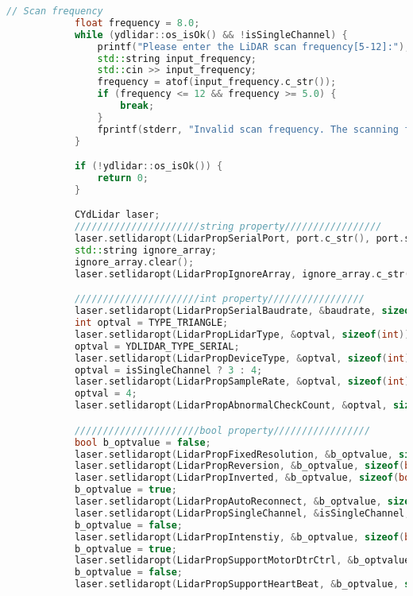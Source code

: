 \begin{lstlisting}[language={C++}, caption={C\'odigo de ejemplo de Kinect y LiDAR}, label={fresd}]
            // Scan frequency
            float frequency = 8.0;
            while (ydlidar::os_isOk() && !isSingleChannel) {
                printf("Please enter the LiDAR scan frequency[5-12]:");
                std::string input_frequency;
                std::cin >> input_frequency;
                frequency = atof(input_frequency.c_str());
                if (frequency <= 12 && frequency >= 5.0) {
                    break;
                }
                fprintf(stderr, "Invalid scan frequency. The scanning frequency range is 5 to 12 Hz. Please re-enter.\n");
            }

            if (!ydlidar::os_isOk()) {
                return 0;
            }

            CYdLidar laser;
            //////////////////////string property/////////////////
            laser.setlidaropt(LidarPropSerialPort, port.c_str(), port.size());
            std::string ignore_array;
            ignore_array.clear();
            laser.setlidaropt(LidarPropIgnoreArray, ignore_array.c_str(), ignore_array.size());

            //////////////////////int property/////////////////
            laser.setlidaropt(LidarPropSerialBaudrate, &baudrate, sizeof(int));
            int optval = TYPE_TRIANGLE;
            laser.setlidaropt(LidarPropLidarType, &optval, sizeof(int));
            optval = YDLIDAR_TYPE_SERIAL;
            laser.setlidaropt(LidarPropDeviceType, &optval, sizeof(int));
            optval = isSingleChannel ? 3 : 4;
            laser.setlidaropt(LidarPropSampleRate, &optval, sizeof(int));
            optval = 4;
            laser.setlidaropt(LidarPropAbnormalCheckCount, &optval, sizeof(int));

            //////////////////////bool property/////////////////
            bool b_optvalue = false;
            laser.setlidaropt(LidarPropFixedResolution, &b_optvalue, sizeof(bool));
            laser.setlidaropt(LidarPropReversion, &b_optvalue, sizeof(bool));
            laser.setlidaropt(LidarPropInverted, &b_optvalue, sizeof(bool));
            b_optvalue = true;
            laser.setlidaropt(LidarPropAutoReconnect, &b_optvalue, sizeof(bool));
            laser.setlidaropt(LidarPropSingleChannel, &isSingleChannel, sizeof(bool));
            b_optvalue = false;
            laser.setlidaropt(LidarPropIntenstiy, &b_optvalue, sizeof(bool));
            b_optvalue = true;
            laser.setlidaropt(LidarPropSupportMotorDtrCtrl, &b_optvalue, sizeof(bool));
            b_optvalue = false;
            laser.setlidaropt(LidarPropSupportHeartBeat, &b_optvalue, sizeof(bool));


\end{lstlisting}
